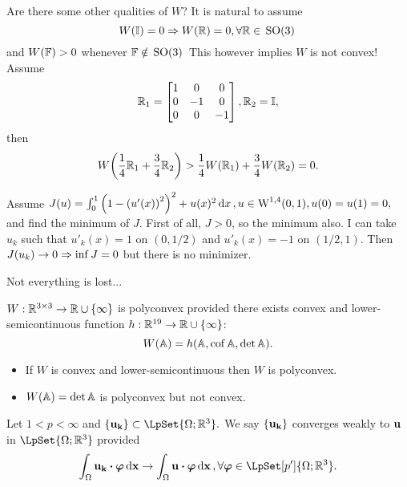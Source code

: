 \documentclass[reqno, a4paper]{article}
\begin{document}
Are there some other qualities of $W$? It is natural to assume
\[
	W\qty(\mathbb{I}) = 0 \Rightarrow W\qty(\mathbb{R})=0, \forall \mathbb{R}\in \, \text{SO(3)} \,
\]
and $W\qty(\mathbb{F})>0$ whenever $\mathbb{F} \notin \, \text{SO(3)} \,$
This however implies $W$ is not convex! Assume
\[
	\mathbb{R}_1 = \begin{bmatrix} 1 & 0 & 0\\ 0 & -1 & 0\\ 0 & 0 & -1 \end{bmatrix}, \mathbb{R}_2 = \mathbb{I},
\]
then
\[
	W\qty(\frac{1}{4}\mathbb{R}_1+\frac{3}{4}\mathbb{R}_2)>\frac{1}{4}W\qty(\mathbb{R}_1)+\frac{3}{4}W\qty(\mathbb{R}_2)=0.
\]

\begin{example}
Assume $J(u) = \int_{0}^1 \qty(1-\qty(u'(x))^{2})^{2}+u(x)^{2}\dd{x}, u \in \text{W}^{1,4}(0,1), u(0) = u(1) = 0,$ and find the minimum of $J$. First of all, $J>0$, so the minimum also. I can take $u_k$ such that $u'_k(x) = 1$ on $(0,1/2)$ and $u'_k(x) = -1$ on $(1/2,1)$. Then $J\qty(u_k)\to 0 \Rightarrow \inf J = 0$ but there is no minimizer.
\end{example}

Not everything is lost...

\begin{definition}
	$W: {\mathbb R}^{3 \times 3}\to {\mathbb R} \cup \{\infty\}$ is polyconvex provided there exists convex and lower-semicontinuous function $h: {\mathbb R}^{19}\to {\mathbb R} \cup \{\infty\}$:
\[
	W\qty(\mathbb{A})=h\qty(\mathbb{A}, \operatorname{cof} \mathbb{A}, \det \mathbb{A}).
\]
\end{definition}

\begin{example}
	\begin{itemize}
		\item	If $W$ is convex and lower-semicontinuous then $W$ is polyconvex. 
		\item	$W\qty(\mathbb{A}) = \det \mathbb{A}$ is polyconvex but not convex.
	\end{itemize}
\end{example}

\begin{remark}
	Let $1<p<\infty$ and $\{\vb{u_k}\} \subset \LpSet{\Omega; \R^3}.$ We say $\{\vb{u_k}\}$ converges weakly to $\vb{u}$ in $\LpSet{\Omega;\R^3}$ provided
	\[
		\int_{\Omega}\vb{u_k} \vdot \vb*{\varphi}\dd{\vb{x}} \to \int_{\Omega}\vb{u}\vdot \vb*{\varphi}\dd{\vb{x}}, \forall \vb*{\varphi} \in \LpSet[p']{\Omega;\R^3}.
	\]
\end{remark}
\end{document}
